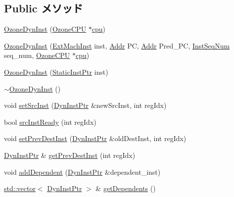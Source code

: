 \subsection*{Public メソッド}
\begin{DoxyCompactItemize}
\item 
\hyperlink{classOzoneDynInst_a0d71ba7c29db1d27e57fe7c78e711c6d}{OzoneDynInst} (\hyperlink{classOzoneCPU}{OzoneCPU} $\ast$\hyperlink{classBaseDynInst_af0927cfb92eca43bfa3bfd5ce19af308}{cpu})
\item 
\hyperlink{classOzoneDynInst_a4add552cfa23478e47fd76f306e824a3}{OzoneDynInst} (\hyperlink{classOzoneDynInst_a5605d4fc727eae9e595325c90c0ec108}{ExtMachInst} inst, \hyperlink{base_2types_8hh_af1bb03d6a4ee096394a6749f0a169232}{Addr} PC, \hyperlink{base_2types_8hh_af1bb03d6a4ee096394a6749f0a169232}{Addr} Pred\_\-PC, \hyperlink{inst__seq_8hh_a258d93d98edaedee089435c19ea2ea2e}{InstSeqNum} seq\_\-num, \hyperlink{classOzoneCPU}{OzoneCPU} $\ast$\hyperlink{classBaseDynInst_af0927cfb92eca43bfa3bfd5ce19af308}{cpu})
\item 
\hyperlink{classOzoneDynInst_a9beb8a1e92eb999f4d1a304ff8ac9ff1}{OzoneDynInst} (\hyperlink{classRefCountingPtr}{StaticInstPtr} inst)
\item 
\hyperlink{classOzoneDynInst_a29f7890cfe51b11cee12ebd8023d0d48}{$\sim$OzoneDynInst} ()
\item 
void \hyperlink{classOzoneDynInst_a3df27bece3830b65ac7c0a8868fff9d8}{setSrcInst} (\hyperlink{classOzoneDynInst_a028ce10889c5f6450239d9e9a7347976}{DynInstPtr} \&newSrcInst, int regIdx)
\item 
bool \hyperlink{classOzoneDynInst_abd9ccfd808ecf42a7a29602c82011672}{srcInstReady} (int regIdx)
\item 
void \hyperlink{classOzoneDynInst_ae4ceee955b690a2898e5a0c609c9697d}{setPrevDestInst} (\hyperlink{classOzoneDynInst_a028ce10889c5f6450239d9e9a7347976}{DynInstPtr} \&oldDestInst, int regIdx)
\item 
\hyperlink{classOzoneDynInst_a028ce10889c5f6450239d9e9a7347976}{DynInstPtr} \& \hyperlink{classOzoneDynInst_ada8a08e554bca2a63067ff5350f49b6c}{getPrevDestInst} (int regIdx)
\item 
void \hyperlink{classOzoneDynInst_a94196a9ba20d5dd3f2e6bb5117417453}{addDependent} (\hyperlink{classOzoneDynInst_a028ce10889c5f6450239d9e9a7347976}{DynInstPtr} \&dependent\_\-inst)
\item 
\hyperlink{classstd_1_1vector}{std::vector}$<$ \hyperlink{classOzoneDynInst_a028ce10889c5f6450239d9e9a7347976}{DynInstPtr} $>$ \& \hyperlink{classOzoneDynInst_a26eb9ab258ccdd0e4a62062b6bc50446}{getDependents} ()

\end{DoxyCompactItemize}

